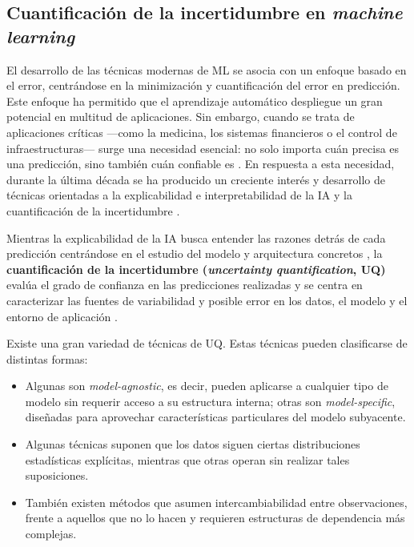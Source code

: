 
\subsection{Cuantificación de la incertidumbre en \textit{machine learning}} 

El desarrollo de las técnicas modernas de ML 
se asocia con un enfoque basado en el error, centrándose en la minimización y cuantificación del error en
predicción. 
Este enfoque ha permitido que el aprendizaje automático despliegue un 
gran potencial en multitud de aplicaciones.
Sin embargo, cuando se trata de aplicaciones críticas ---como la medicina, los sistemas financieros o el 
control de infraestructuras--- surge una necesidad esencial: no solo importa cuán precisa es una predicción, 
sino también cuán confiable es \cite{begoli2019}. 
En respuesta a esta necesidad, durante la última década se ha producido un creciente interés y desarrollo de 
técnicas orientadas a la explicabilidad e interpretabilidad de la IA 
\cite{angelov2021, ali2023, miller2019, loh2022} y la cuantificación de la incertidumbre
\cite{abdar2021, psaros2023, nemani2023}.

Mientras la explicabilidad de la IA busca entender las razones detrás de cada predicción centrándose en el 
estudio del modelo y arquitectura concretos \cite{salvi2025}, la 
\textbf{cuantificación de la incertidumbre (\textit{uncertainty quantification}, UQ)} evalúa el grado de 
confianza en las predicciones realizadas y se centra en caracterizar las fuentes de variabilidad y posible 
error en los datos, el modelo y el entorno de aplicación \cite{nemani2023}.

Existe una gran variedad de técnicas de UQ. Estas técnicas pueden clasificarse de distintas formas: 

\begin{itemize}

    \item Algunas son \textit{model-agnostic}, es decir, pueden aplicarse a cualquier tipo de modelo sin 
    requerir acceso a su estructura interna; otras son \textit{model-specific}, diseñadas para aprovechar 
    características particulares del modelo subyacente. 

    \item Algunas técnicas suponen que los datos siguen ciertas distribuciones estadísticas explícitas, 
    mientras que otras operan sin realizar tales suposiciones.

    \item También existen métodos que asumen intercambiabilidad entre observaciones, frente a aquellos que 
    no lo hacen y requieren estructuras de dependencia más complejas. 

\end{itemize} 


